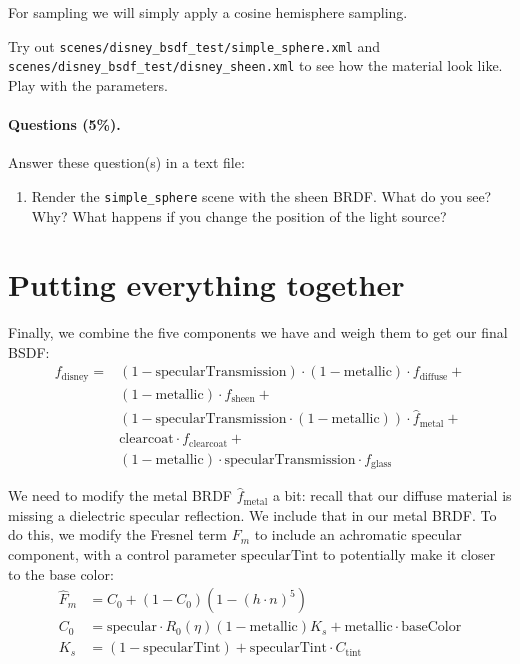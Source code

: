 For sampling we will simply apply a cosine hemisphere sampling.

Try out \lstinline{scenes/disney_bsdf_test/simple_sphere.xml} and \lstinline{scenes/disney_bsdf_test/disney_sheen.xml} to see how the material look like. Play with the parameters.

\paragraph{Questions (5\%).} Answer these question(s) in a text file:
\begin{enumerate}
	\item Render the \lstinline{simple_sphere} scene with the sheen BRDF. What do you see? Why? What happens if you change the position of the light source?
\end{enumerate}

\section{Putting everything together}
Finally, we combine the five components we have and weigh them to get our final BSDF:
\begin{equation}
\begin{aligned}
f_{\text{disney}} =& (1 - \text{specularTransmission}) \cdot (1 - \text{metallic}) \cdot f_{\text{diffuse}} + \\
                   & (1 - \text{metallic}) \cdot f_{\text{sheen}} + \\
                   & (1 - \text{specularTransmission} \cdot (1 - \text{metallic})) \cdot \hat{f}_{\text{metal}} + \\
                   & \text{clearcoat} \cdot f_{\text{clearcoat}} + \\
                   & (1 - \text{metallic}) \cdot \text{specularTransmission} \cdot f_{\text{glass}}
\end{aligned}
\label{eq:disney_bsdf}
\end{equation}

We need to modify the metal BRDF $\hat{f}_{\text{metal}}$ a bit: recall that our diffuse material is missing
a dielectric specular reflection. We include that in our metal BRDF. To do this, we modify the Fresnel term $F_m$ to include an achromatic specular component, with a control parameter $\text{specularTint}$ to potentially make it closer to the base color:
\begin{equation}
\begin{aligned}
	\hat{F}_m &= C_0 + (1 - C_0) (1 - \left(h \cdot n\right)^5) \\
	C_0 &= \text{specular} \cdot R_0(\eta) (1 - \text{metallic}) K_s + \text{metallic} \cdot \text{baseColor} \\
	K_s &= (1 - \text{specularTint}) + \text{specularTint} \cdot C_{\text{tint}}
\end{aligned}
\end{equation}

